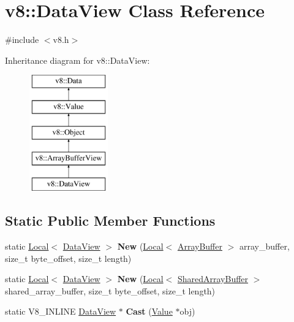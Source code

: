 \hypertarget{classv8_1_1DataView}{}\section{v8\+:\+:Data\+View Class Reference}
\label{classv8_1_1DataView}


{\ttfamily \#include $<$v8.\+h$>$}

Inheritance diagram for v8\+:\+:Data\+View\+:\begin{figure}[H]
\begin{center}
\leavevmode
\includegraphics[height=5.000000cm]{classv8_1_1DataView}
\end{center}
\end{figure}
\subsection*{Static Public Member Functions}
\begin{DoxyCompactItemize}
\item 
static \hyperlink{classv8_1_1Local}{Local}$<$ \hyperlink{classv8_1_1DataView}{Data\+View} $>$ {\bfseries New} (\hyperlink{classv8_1_1Local}{Local}$<$ \hyperlink{classv8_1_1ArrayBuffer}{Array\+Buffer} $>$ array\+\_\+buffer, size\+\_\+t byte\+\_\+offset, size\+\_\+t length)\hypertarget{classv8_1_1DataView_a40dcfc9ed56dbc41f48ddc49271cbab0}{}\label{classv8_1_1DataView_a40dcfc9ed56dbc41f48ddc49271cbab0}

\item 
static \hyperlink{classv8_1_1Local}{Local}$<$ \hyperlink{classv8_1_1DataView}{Data\+View} $>$ {\bfseries New} (\hyperlink{classv8_1_1Local}{Local}$<$ \hyperlink{classv8_1_1SharedArrayBuffer}{Shared\+Array\+Buffer} $>$ shared\+\_\+array\+\_\+buffer, size\+\_\+t byte\+\_\+offset, size\+\_\+t length)\hypertarget{classv8_1_1DataView_a8310e075564dd9f26122be2733995ba2}{}\label{classv8_1_1DataView_a8310e075564dd9f26122be2733995ba2}

\item 
static V8\+\_\+\+I\+N\+L\+I\+NE \hyperlink{classv8_1_1DataView}{Data\+View} $\ast$ {\bfseries Cast} (\hyperlink{classv8_1_1Value}{Value} $\ast$obj)\hypertarget{classv8_1_1DataView_aa97d15fcb28c6c002a52d32877c8fd3a}{}\label{classv8_1_1DataView_aa97d15fcb28c6c002a52d32877c8fd3a}

\end{DoxyCompactItemize}
